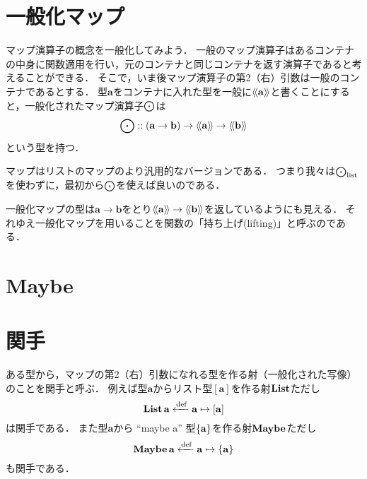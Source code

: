 \documentclass[twocolumn]{jsbook}
\newcommand{\typename}[1]{\mathbf{#1}}
\newcommand{\listtype}[1]{\left[#1\right]}
\begin{document}
\section{一般化マップ}

マップ演算子の概念を一般化してみよう．
一般のマップ演算子はあるコンテナの中身に関数適用を行い，元のコンテナと同じコンテナを返す演算子であると考えることができる．
そこで，いま後マップ演算子の第2（右）引数は一般のコンテナであるとする．
型$\typename{a}$をコンテナに入れた型を一般に$\generalcontainer{\typename{a}}$と書くことにすると，一般化されたマップ演算子$\bigodot$は$$\mapfunc::(\typename{a}\rightarrow\typename{b})\rightarrow\generalcontainer{\typename{a}}\rightarrow\generalcontainer{\typename{b}}$$という型を持つ．

マップはリストのマップのより汎用的なバージョンである．
つまり我々は$\bigodot_\text{list}$を使わずに，最初から$\bigodot$を使えば良いのである．

一般化マップの型は$\typename{a}\rightarrow\typename{b}$をとり$\generalcontainer{\typename{a}}\rightarrow\generalcontainer{\typename{b}}$を返しているようにも見える．
それゆえ一般化マップを用いることを関数の「持ち上げ(lifting)」と呼ぶのである．

\section{Maybe}



\section{関手}

ある型から，マップの第2（右）引数になれる型を作る射（一般化された写像）のことを関手と呼ぶ．
例えば型$\typename{a}$からリスト型$[\typename{a}]$を作る射$\mathop{\mathop{\textbf{List}}}$ただし$$\listfunctor\typename{a}\defeq\typename{a}\mapsto\listtype{\typename{a}}$$は関手である．
また型$\typename{a}$から ``maybe a'' 型$\maybe{\typename{a}}$を作る射$\mathop{\mathop{\textbf{Maybe}}}$ただし$$\maybefunctor\typename{a}\defeq\typename{a}\mapsto\maybe{\typename{a}}$$も関手である．
\end{document}
